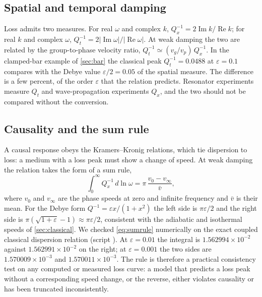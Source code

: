 \subsection{Spatial and temporal damping}
Loss admits two measures. For real $\omega$ and complex $k$, $Q_x^{-1}=2\operatorname{Im}k/\operatorname{Re}k$; for real $k$ and complex $\omega$, $Q_t^{-1}=2|\operatorname{Im}\omega|/|\operatorname{Re}\omega|$. At weak damping the two are related by the group-to-phase velocity ratio, $Q_t^{-1}\simeq(v_g/v_p)\,Q_x^{-1}$. In the clamped-bar example of \cref{sec:bar} the classical peak $Q_t^{-1}=0.0488$ at $\varepsilon=0.1$ compares with the Debye value $\varepsilon/2=0.05$ of the spatial measure. The difference is a few percent, of the order $\varepsilon$ that the relation predicts. Resonator experiments measure $Q_t$ and wave-propagation experiments $Q_x$, and the two should not be compared without the conversion.

\subsection{Causality and the sum rule}
A causal response obeys the Kramers--Kronig relations, which tie dispersion to loss: a medium with a loss peak must show a change of speed. At weak damping the relation takes the form of a sum rule,
\begin{equation}\label{eq:sumrule}
\int_0^\infty Q_x^{-1}\,d\ln\omega=\pi\,\frac{v_0-v_\infty}{\bar v},
\end{equation}
where $v_0$ and $v_\infty$ are the phase speeds at zero and infinite frequency and $\bar v$ is their mean. For the Debye form $Q^{-1}=\varepsilon x/(1+x^2)$ the left side is $\pi\varepsilon/2$ and the right side is $\pi(\sqrt{1+\varepsilon}-1)\approx\pi\varepsilon/2$, consistent with the adiabatic and isothermal speeds of \cref{sec:classical}. We checked \cref{eq:sumrule} numerically on the exact coupled classical dispersion relation (script ). At $\varepsilon=0.01$ the integral is $1.562994\times10^{-2}$ against $1.562991\times10^{-2}$ on the right; at $\varepsilon=0.001$ the two sides are $1.570009\times10^{-3}$ and $1.570011\times10^{-3}$. The rule is therefore a practical consistency test on any computed or measured loss curve: a model that predicts a loss peak without a corresponding speed change, or the reverse, either violates causality or has been truncated inconsistently.

